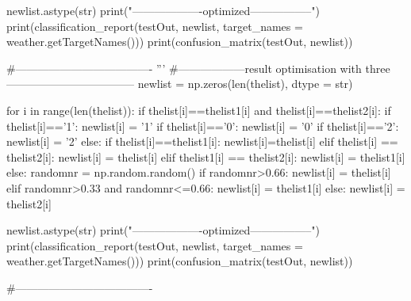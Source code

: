 \documentclass[12pt]{article}
\begin{document}
\begin{python}
newlist.astype(str)
print("-------------------optimized-----------------")
print(classification_report(testOut, newlist, target_names = weather.getTargetNames()))
print(confusion_matrix(testOut, newlist))

#-------------------------------------
'''
#------------------result optimisation with three-----------------------------------
newlist = np.zeros(len(thelist), dtype = str)



for i in range(len(thelist)):
    if thelist[i]==thelist1[i] and thelist[i]==thelist2[i]:
        if thelist[i]=='1':
            newlist[i] = '1'
        if thelist[i]=='0':
            newlist[i] = '0'
        if thelist[i]=='2':
            newlist[i] = '2'
    else:
        if thelist[i]==thelist1[i]:
            newlist[i]=thelist[i]
        elif thelist[i] == thelist2[i]:
            newlist[i] = thelist[i]
        elif thelist1[i] == thelist2[i]:
            newlist[i] = thelist1[i]
        else:
            randomnr = np.random.random()
            if randomnr>0.66:
                newlist[i] = thelist[i]
            elif randomnr>0.33 and randomnr<=0.66:
                newlist[i] = thelist1[i]
            else:
                newlist[i] = thelist2[i]

newlist.astype(str)
print("-------------------optimized-----------------")
print(classification_report(testOut, newlist, target_names = weather.getTargetNames()))
print(confusion_matrix(testOut, newlist))


#-------------------------------------




\end{python}
\end{document}

